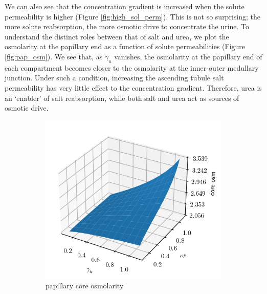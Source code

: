 \documentclass{article}
\numberwithin{equation}{section} %
\begin{document}
We can also see that the concentration gradient is increased when the solute permeability is higher (Figure \ref{fig:high_sol_perm}).
This is not so surprising; the more solute reabsorption, the more osmotic drive to concentrate the urine.
To understand the distinct roles between that of salt and urea, we plot the osmolarity at the papillary end as a function of solute permeabilities (Figure \ref{fig:pap_osm}).
We see that, as $\gamma_u$ vanishes, the osmolarity at the papillary end of each compartment becomes closer to the osmolarity at the inner-outer medullary junction.
Under such a condition, increasing the ascending tubule salt permeability has very little effect to the concentration gradient.
Therefore, urea is an `enabler' of salt reabsorption, while both salt and urea act as sources of osmotic drive.
\begin{figure}
    \centering
    \begin{subfigure}{0.5\textwidth}
        \centering
        \includegraphics[width=\linewidth]{../results/7-20-2023/core_osm.png}
        \caption{papillary core osmolarity}
        \label{fig:core_osm}
    \end{subfigure}%
    \begin{subfigure}{0.5\textwidth}
        \centering

\end{subfigure}
\end{figure}
\end{document}
